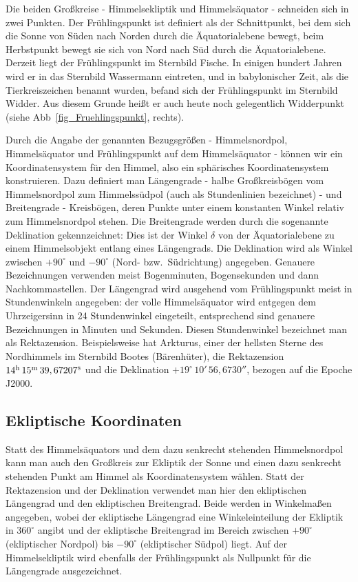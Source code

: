  Die beiden Gro\ss kreise - Himmelsekliptik und Himmels\"aquator - schneiden sich in zwei
 Punkten. Der Fr\"uhlingspunkt ist definiert als der Schnittpunkt, bei dem sich die Sonne
 von S\"uden nach Norden durch die \"Aquatorialebene bewegt, beim Herbstpunkt bewegt sie sich von Nord
 nach S\"ud durch die \"Aquatorialebene. Derzeit liegt der Fr\"uhlingspunkt im Sternbild Fische. In einigen
 hundert Jahren wird er in das Sternbild Wassermann eintreten, und in babylonischer Zeit, als die Tierkreiszeichen
 benannt wurden, befand sich der Fr\"uhlingspunkt im Sternbild Widder. Aus diesem Grunde hei\ss t er 
 auch heute noch gelegentlich Widderpunkt (siehe Abb\ \ref{fig_Fruehlingspunkt}, rechts).
 
 Durch die Angabe der genannten Bezugsgr\"o\ss en - Himmelsnordpol, Himmels\"aquator und
 Fr\"uhlingspunkt auf dem Himmels\"aquator - k\"onnen wir ein Koordinatensystem f\"ur den Himmel, also
 ein sph\"arisches Koordinatensystem konstruieren.
Dazu definiert man L\"angengrade - halbe Gro\ss kreisb\"ogen vom 
 Himmelsnordpol zum Himmelss\"udpol (auch als Stundenlinien bezeichnet) - 
 und Breitengrade - Kreisb\"ogen, deren Punkte unter einem konstanten
 Winkel relativ zum Himmelsnordpol stehen. Die Breitengrade werden durch die sogenannte
 Deklination 
 gekennzeichnet: Dies ist der Winkel $\delta$ von der \"Aquatorialebene zu einem Himmelsobjekt
 entlang eines L\"angengrads. Die Deklination wird als Winkel zwischen $+90^\circ$ und $-90^\circ$ 
 (Nord- bzw.\ S\"udrichtung) angegeben. Genauere Bezeichnungen verwenden meist Bogenminuten,
 Bogensekunden und dann Nachkommastellen. Der L\"angengrad wird ausgehend vom Fr\"uhlingspunkt
meist in Stundenwinkeln angegeben: der volle Himmels\"aquator wird entgegen dem Uhrzeigersinn in 
24 Stundenwinkel eingeteilt, entsprechend sind genauere Bezeichnungen in Minuten und Sekunden.
Diesen Stundenwinkel bezeichnet man als Rektazension.
Beispielsweise hat Arkturus, einer der hellsten Sterne des Nordhimmels im Sternbild Bootes (B\"arenh\"uter), 
die Rektazension $14^{\rm h}\,15^{\rm m}\,39,67207^{\rm s}$ und die Deklination $+19^\circ\, 10'\, 56,6730''$,
bezogen auf die Epoche J2000. 

\subsection{Ekliptische Koordinaten}

Statt des Himmels\"aquators und dem dazu senkrecht stehenden Himmelsnordpol kann man 
auch
den Gro\ss kreis zur Ekliptik der Sonne und einen dazu senkrecht stehenden Punkt am Himmel
als Koordinatensystem w\"ahlen. Statt der Rektazension und der Deklination verwendet man hier den
ekliptischen L\"angengrad und den ekliptischen Breitengrad. Beide werden in Winkelma\ss en angegeben,
wobei der ekliptische L\"angengrad eine Winkeleinteilung der Ekliptik in $360^\circ$ angibt und der ekliptische
Breitengrad im Bereich zwischen $+90^\circ$ (ekliptischer Nordpol) bis $-90^\circ$ (ekliptischer S\"udpol) liegt. 
Auf der Himmelsekliptik wird ebenfalls der Fr\"uhlingspunkt als
Nullpunkt f\"ur die L\"angengrade ausgezeichnet. 

